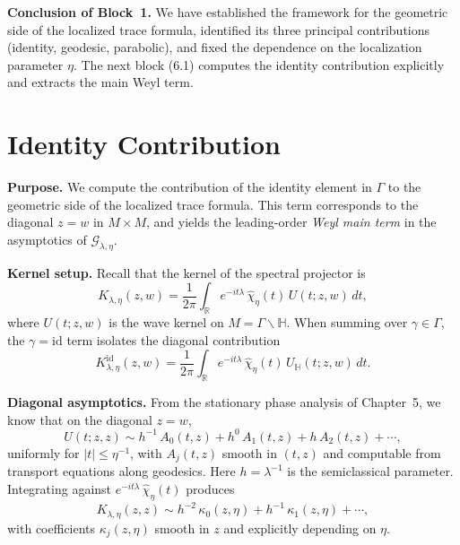 \medskip

\noindent\textbf{Conclusion of Block~1.}
We have established the framework for the geometric side of the localized trace formula,
identified its three principal contributions (identity, geodesic, parabolic),
and fixed the dependence on the localization parameter $\eta$.
The next block (6.1) computes the identity contribution explicitly and extracts the main Weyl term.


\section{Identity Contribution}

\noindent\textbf{Purpose.}
We compute the contribution of the identity element in $\Gamma$ to the geometric side of the localized trace formula.  
This term corresponds to the diagonal $z=w$ in $M\times M$,  
and yields the leading-order \emph{Weyl main term} in the asymptotics of $\mathcal{G}_{\lambda,\eta}$.

\medskip

\noindent\textbf{Kernel setup.}
Recall that the kernel of the spectral projector is
\[
  K_{\lambda,\eta}(z,w) = \frac{1}{2\pi} \int_{\mathbb{R}} e^{-it\lambda}\,
  \widehat{\chi}_\eta(t)\, U(t;z,w)\, dt,
\]
where $U(t;z,w)$ is the wave kernel on $M=\Gamma\backslash \mathbb{H}$.  
When summing over $\gamma\in \Gamma$, the $\gamma=\mathrm{id}$ term isolates the diagonal contribution
\[
  K_{\lambda,\eta}^{\mathrm{id}}(z,w) = \frac{1}{2\pi}\int_{\mathbb{R}}
  e^{-it\lambda}\,\widehat{\chi}_\eta(t)\, U_{\mathbb{H}}(t;z,w)\, dt.
\]

\medskip

\noindent\textbf{Diagonal asymptotics.}
From the stationary phase analysis of Chapter~5, we know that on the diagonal $z=w$,
\[
  U(t;z,z) \sim h^{-1}\,A_0(t,z) + h^0\,A_1(t,z) + h\,A_2(t,z) + \cdots,
\]
uniformly for $|t|\le \eta^{-1}$,  
with $A_j(t,z)$ smooth in $(t,z)$ and computable from transport equations along geodesics.  
Here $h=\lambda^{-1}$ is the semiclassical parameter.  
Integrating against $e^{-it\lambda}\,\widehat{\chi}_\eta(t)$ produces
\[
  K_{\lambda,\eta}(z,z) \sim h^{-2}\,\kappa_0(z,\eta) + h^{-1}\,\kappa_1(z,\eta) + \cdots,
\]
with coefficients $\kappa_j(z,\eta)$ smooth in $z$ and explicitly depending on $\eta$.

\medskip

